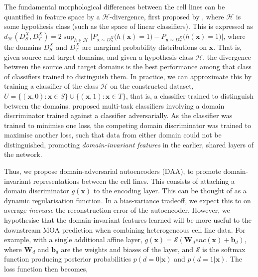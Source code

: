 The fundamental morphological differences between the cell lines can be quantified in feature space by a $\mathcal{H}$-divergence, first proposed by \cite{ben2010theory}, where $\mathcal{H}$ is some hypothesis class (such as the space of linear classifiers). This is expressed as $d_\mathcal{H}(D_S^X, D_T^X) = 2\sup_{h \in \mathcal{H}}\Big|P_{\mathbf{x} \sim D_S^X}\big(h(\mathbf{x})= 1\big) - P_{\mathbf{x} \sim D_T^X}\big(h(\mathbf{x}) = 1\big)\Big|$, where the domains $D_S^X$ and $D_T^X$ are marginal probability distributions on $\mathbf{x}$. That is, given source and target domains, and given a hypothesis class $\mathcal{H}$, the divergence between the source and target domains is the best performance among that class of classifiers trained to distinguish them. In practice, we can approximate this by training a classifier of the class $\mathcal{H}$ on the constructed dataset, $U = \{(\mathbf{x}, 0) : \mathbf{x} \in S\} \cup \{(\mathbf{x}, 1) : \mathbf{x} \in T\}$, that is, a classifier trained to distinguish between the domains.
\cite{ajakan2014domain} proposed multi-task classifiers involving a domain discriminator trained against a classifier adversarially. As the classifier was trained to minimise one loss, the competing domain discriminator was trained to maximise another loss, such that data from either domain could not be distinguished, promoting \emph{domain-invariant features} in the earlier, shared layers of the network.

Thus, we propose domain-adversarial autoencoders (DAA), to promote domain-invariant representations between the cell lines. This consists of attaching a domain discriminator $g(\mathbf{x})$ to the encoding layer. This can be thought of as a dynamic regularisation function. In a bias-variance tradeoff, we expect this to on average \emph{increase} the reconstruction error of the autoencoder. However, we hypothesise that the domain-invariant features learned will be more useful to the downstream MOA prediction when combining heterogeneous cell line data. For example, with a single additional affine layer, $g(\mathbf{x}) = \mathcal{S}(\mathbf{W}_denc(\mathbf{x}) + \mathbf{b}_d)$, where $\mathbf{W}_d$ and $\mathbf{b}_d$ are the weights and biases of the layer, and $\mathcal{S}$ is the softmax function producing posterior probabilities $p(d = 0 | \mathbf{x})$ and $p(d = 1 | \mathbf{x})$. The loss function then becomes,

